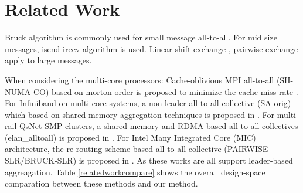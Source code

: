 \section{Related Work}

Bruck algorithm \cite{bruck1997efficient} is commonly used for small message all-to-all. For mid size messages, isend-irecv algorithm is used. Linear shift exchange \cite{ranka1994static}, pairwise exchange\cite{thakur2005optimization} apply to large messages.

When considering the multi-core processors:  
Cache-oblivious MPI all-to-all (SH-NUMA-CO) based on morton order is proposed to minimize the cache miss rate \cite{li2017cache}.
For Infiniband on multi-core systems, a non-leader all-to-all collective (SA-orig) which based on shared memory aggregation techniques is proposed in \cite{kumar2008scaling}.
For multi-rail QsNet SMP clusters, a shared memory and RDMA based all-to-all collectives (elan\_alltoall) is proposed in \cite{qian2008efficient}.
For Intel Many Integrated Core (MIC) architecture,  the re-routing scheme based all-to-all collective (PAIRWISE-SLR/BRUCK-SLR) is proposed in \cite{venkatesh2014high}. 
As these works are all support leader-based aggreagation. 
Table \ref{relatedworkcompare} shows the overall design-space comparation between these methods and our method.


